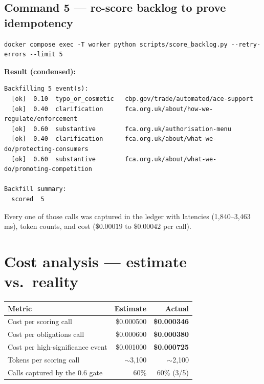 \documentclass[11pt,a4paper]{article}
\begin{document}
\subsection{Command 5 --- re-score backlog to prove idempotency}

\begin{lstlisting}[style=shell]
docker compose exec -T worker python scripts/score_backlog.py --retry-errors --limit 5
\end{lstlisting}

\textbf{Result (condensed):}
\begin{lstlisting}[style=output]
Backfilling 5 event(s):
  [ok]  0.10  typo_or_cosmetic   cbp.gov/trade/automated/ace-support
  [ok]  0.40  clarification      fca.org.uk/about/how-we-regulate/enforcement
  [ok]  0.60  substantive        fca.org.uk/authorisation-menu
  [ok]  0.40  clarification      fca.org.uk/about/what-we-do/protecting-consumers
  [ok]  0.60  substantive        fca.org.uk/about/what-we-do/promoting-competition

Backfill summary:
  scored  5
\end{lstlisting}

Every one of those calls was captured in the ledger with latencies
(1{,}840--3{,}463\,ms), token counts, and cost ($\$0.00019$ to $\$0.00042$
per call).

\section{Cost analysis --- estimate vs.\ reality}

\begin{center}
\small
\begin{tabularx}{\linewidth}{Xrr}
\toprule
\textbf{Metric} & \textbf{Estimate} & \textbf{Actual} \\
\midrule
Cost per scoring call              & \$0.000500 & \textbf{\$0.000346} \\
Cost per obligations call          & \$0.000600 & \textbf{\$0.000380} \\
Cost per high-significance event   & \$0.001000 & \textbf{\$0.000725} \\
Tokens per scoring call            & $\sim$3{,}100 & $\sim$2{,}100 \\
Calls captured by the 0.6 gate     & 60\%       & 60\% (3/5) \\
\bottomrule
\end{tabularx}
\end{center}
\end{document}
